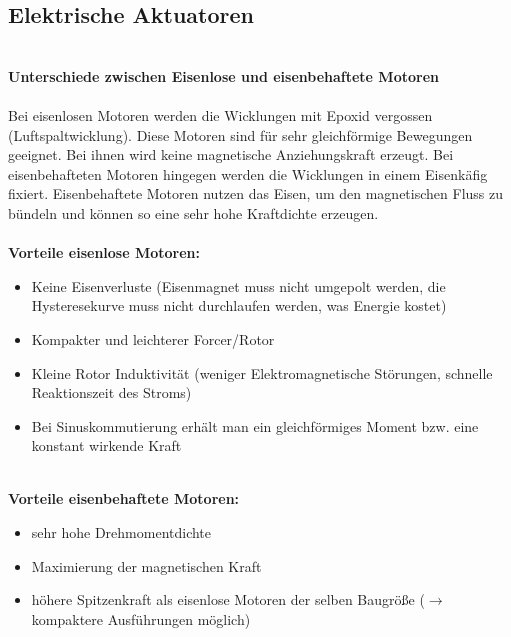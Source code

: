 		\subsection{Elektrische Aktuatoren}
			\leavevmode\\
			\textbf{\large Unterschiede zwischen Eisenlose und eisenbehaftete Motoren\\\\}
			Bei eisenlosen Motoren werden die Wicklungen mit Epoxid vergossen (Luftspaltwicklung). Diese Motoren sind für sehr gleichförmige Bewegungen geeignet. Bei ihnen wird keine magnetische Anziehungskraft erzeugt.
			Bei eisenbehafteten Motoren hingegen werden die Wicklungen in einem Eisenkäfig fixiert. Eisenbehaftete Motoren nutzen das Eisen, um den magnetischen Fluss zu bündeln und können so eine sehr hohe Kraftdichte erzeugen.\\\\			
			\textbf{Vorteile eisenlose Motoren:}
			\begin{itemize}
				\item Keine Eisenverluste (Eisenmagnet muss nicht umgepolt werden, die Hysteresekurve muss nicht durchlaufen werden, was Energie kostet)
				\item Kompakter und leichterer Forcer/Rotor
				\item Kleine Rotor Induktivität (weniger Elektromagnetische Störungen, schnelle Reaktionszeit des Stroms)
				\item Bei Sinuskommutierung erhält man ein gleichförmiges Moment bzw. eine konstant wirkende Kraft
			\end{itemize}
			\leavevmode \\
			\textbf{Vorteile eisenbehaftete Motoren:}
			\begin{itemize}
				\item sehr hohe Drehmomentdichte
				\item Maximierung der magnetischen Kraft
				\item höhere Spitzenkraft als eisenlose Motoren der selben Baugröße ($ \rightarrow $ kompaktere Ausführungen möglich)
			\end{itemize}
			
			\newpage	
